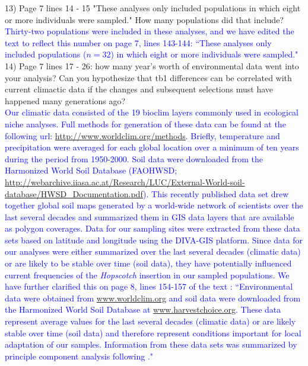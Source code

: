 \documentclass[11pt]{article}
\newcommand{\res}[1]{\noindent \textcolor{blue}{{#1}} \\}
\begin{document}
13) Page 7 lines 14 - 15 "These analyses only included populations in which eight or more individuals were sampled."  How many populations did that include?\\
 
\res{Thirty-two populations were included in these analyses, and we have edited the text to reflect this number on page 7, lines 143-144: ``These analyses only included populations ($n = 32$) in which eight or more individuals were sampled."}

14) Page 7 lines 17 - 26: how many year's worth of environmental data went into your analysis? Can you hypothesize that tb1 differences can be correlated with current climactic data if the changes and subsequent selections must have happened many generations ago?\\
 
\res{Our climatic data consisted of the 19 bioclim layers commonly used in ecological niche analyses. Full methods for generation of these data can be found at the following url: \url{http://www.worldclim.org/methods}. Briefly, temperature and precipitation were averaged for each global location over a minimum of ten years during the period from 1950-2000.  Soil data were downloaded from the Harmonized World Soil Database (FAOHWSD; \url{http://webarchive.iiasa.ac.at/Research/LUC/External-World-soil-database/HWSD_Documentation.pdf}). This recently published data set drew together global soil maps generated by a world-wide network of scientists over the last several decades and summarized them in GIS data layers that are available as polygon coverages. Data for our sampling sites were extracted from these data sets based on latitude and longitude using the DIVA-GIS platform. Since data for our analyses were either summarized over the last several decades (climatic data) or are likely to be stable over time (soil data), they have potentially influenced current frequencies of the \emph{Hopscotch} insertion in our sampled populations. We have further clarified this on page 8, lines 154-157 of the text : ``Environmental data were obtained from \url{www.worldclim.org} and soil data were downloaded from the Harmonized World Soil Database \citep{FAOHWSD} at \url{www.harvestchoice.org}.  These data represent average values for the last several decades (climatic data) or are likely stable over time (soil data) and therefore represent conditions important for local adaptation of our samples.  Information from these data sets was summarized by principle component analysis following \citet{Pyhajarvi2013}."} 
\end{document}
